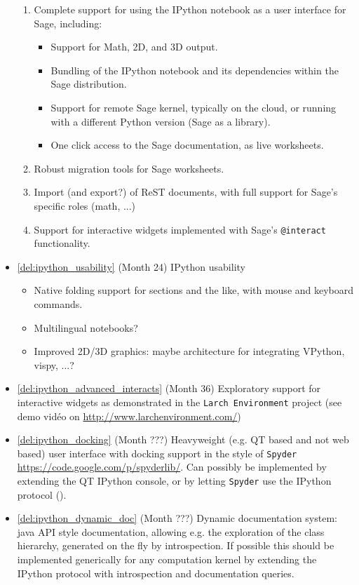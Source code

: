\begin{Workpackage}{\thewpno}
\begin{WPDeliverables}
\begin{itemize}
    \begin{enumerate}
    \item Complete support for using the IPython notebook as a user
      interface for Sage, including:
      \begin{itemize}
      \item Support for Math, 2D, and 3D output.
      \item Bundling of the IPython notebook and its dependencies within
        the Sage distribution.
      \item Support for remote Sage kernel, typically on the cloud, or
        running with a different Python version (Sage as a library).
      \item One click access to the Sage documentation, as live
        worksheets.
      \end{itemize}
    \item Robust migration tools for Sage worksheets.
    \item Import (and export?)  of ReST documents, with full support for
      Sage's specific roles (math, ...)
    \item Support for interactive widgets implemented with Sage's
      \texttt{@interact} functionality.
    \end{enumerate}
  \item \ref{del:ipython_usability} (Month 24) IPython usability
    \begin{itemize}
    \item Native folding support for sections and the like, with mouse
      and keyboard commands.
    \item Multilingual notebooks?
    \item Improved 2D/3D graphics: maybe architecture for integrating
      VPython, vispy, ...?
    \end{itemize}
  \item \ref{del:ipython_advanced_interacts} (Month 36) Exploratory
    support for interactive widgets as demonstrated in the \texttt{Larch
      Environment} project (see demo vidéo on
    \url{http://www.larchenvironment.com/})
  \item \ref{del:ipython_docking} (Month ???) Heavyweight (e.g. QT
    based and not web based) user interface with docking support in
    the style of \texttt{Spyder}
    \url{https://code.google.com/p/spyderlib/}. Can possibly be
    implemented by extending the QT IPython console, or by letting
    \texttt{Spyder} use the IPython protocol ().
  \item \ref{del:ipython_dynamic_doc} (Month ???) Dynamic
    documentation system: java API style documentation, allowing
    e.g. the exploration of the class hierarchy, generated on the fly
    by introspection.  If possible this should be implemented
    generically for any computation kernel by extending the IPython
    protocol with introspection and documentation queries.


\end{itemize}
\end{WPDeliverables}
\end{Workpackage}
